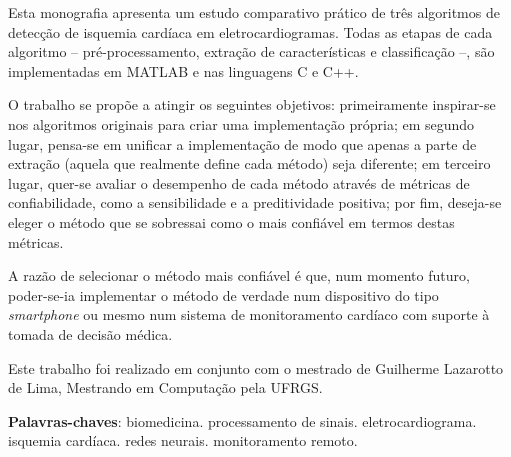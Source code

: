 
\begin{resumo}

\setlength{\parindent}{0.6cm}

Esta monografia apresenta um estudo comparativo prático de três algoritmos de detecção de isquemia cardíaca em eletrocardiogramas. Todas as etapas de cada algoritmo -- pré-processamento, extração de características e classificação --, são implementadas em MATLAB e nas linguagens C e C++.

O trabalho se propõe a atingir os seguintes objetivos: primeiramente inspirar-se nos algoritmos originais para criar uma implementação própria; em segundo lugar, pensa-se em unificar a implementação de modo que apenas a parte de extração (aquela que realmente define cada método) seja diferente; em terceiro lugar, quer-se avaliar o desempenho de cada método através de métricas de confiabilidade, como a sensibilidade e a preditividade positiva; por fim, deseja-se eleger o método que se sobressai como o mais confiável em termos destas métricas.

A razão de selecionar o método mais confiável é que, num momento futuro, poder-se-ia implementar o método de verdade num dispositivo do tipo \emph{smartphone} ou mesmo num sistema de monitoramento cardíaco com suporte à tomada de decisão médica.

Este trabalho foi realizado em conjunto com o mestrado de Guilherme Lazarotto de Lima, Mestrando em Computação pela UFRGS.

\null\vfill
\textbf{Palavras-chaves}: biomedicina. processamento de sinais. eletrocardiograma. isquemia cardíaca. redes neurais. monitoramento remoto.

\end{resumo}